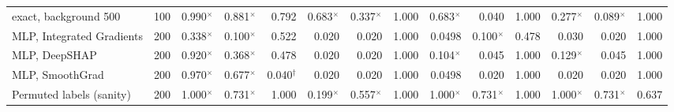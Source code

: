 \begin{tabular}{@{}lrrrrrrrrrrrrr@{}}
\quad exact, background 500 & 100 & 0.990$^{\times}$ & 0.881$^{\times}$ & 0.792 & 0.683$^{\times}$ & 0.337$^{\times}$ & 1.000 & 0.683$^{\times}$ & 0.040 & 1.000 & 0.277$^{\times}$ & 0.089$^{\times}$ & 1.000 \\
MLP, Integrated Gradients & 200 & 0.338$^{\times}$ & 0.100$^{\times}$ & 0.522 & 0.020 & 0.020 & 1.000 & 0.0498 & 0.100$^{\times}$ & 0.478 & 0.030 & 0.020 & 1.000 \\
MLP, DeepSHAP & 200 & 0.920$^{\times}$ & 0.368$^{\times}$ & 0.478 & 0.020 & 0.020 & 1.000 & 0.104$^{\times}$ & 0.045 & 1.000 & 0.129$^{\times}$ & 0.045 & 1.000 \\
MLP, SmoothGrad & 200 & 0.970$^{\times}$ & 0.677$^{\times}$ & 0.040$^{\dagger}$ & 0.020 & 0.020 & 1.000 & 0.0498 & 0.020 & 1.000 & 0.020 & 0.020 & 1.000 \\
\addlinespace
Permuted labels (sanity) & 200 & 1.000$^{\times}$ & 0.731$^{\times}$ & 1.000 & 0.199$^{\times}$ & 0.557$^{\times}$ & 1.000 & 1.000$^{\times}$ & 0.731$^{\times}$ & 1.000 & 1.000$^{\times}$ & 0.731$^{\times}$ & 0.637 \\
\bottomrule
\end{tabular}
